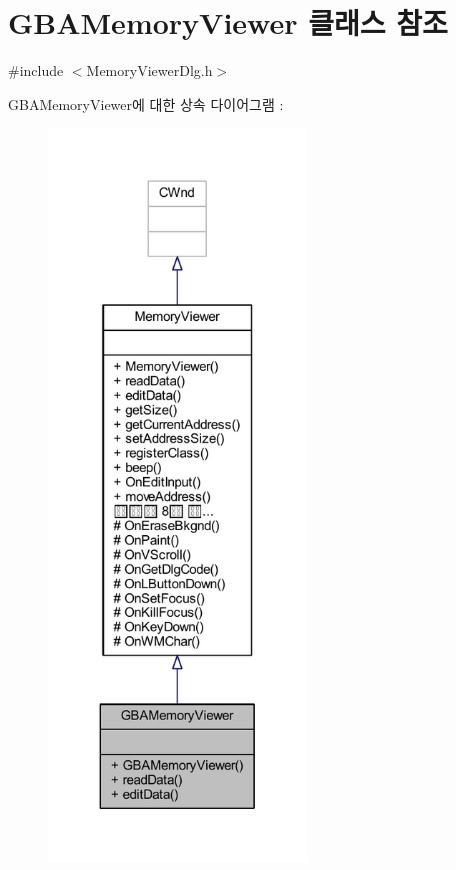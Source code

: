 \hypertarget{class_g_b_a_memory_viewer}{}\section{G\+B\+A\+Memory\+Viewer 클래스 참조}
\label{class_g_b_a_memory_viewer}


{\ttfamily \#include $<$Memory\+Viewer\+Dlg.\+h$>$}



G\+B\+A\+Memory\+Viewer에 대한 상속 다이어그램 \+: \nopagebreak
\begin{figure}[H]
\begin{center}
\leavevmode
\includegraphics[height=550pt]{class_g_b_a_memory_viewer__inherit__graph}
\end{center}
\end{figure}


